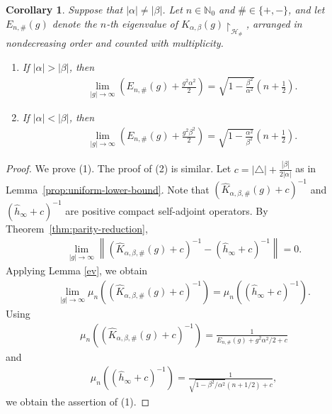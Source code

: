 \documentclass[12pt,dvipdfmx]{article}
\newtheorem{corollary}[theorem]{Corollary}
\newcommand{\NN}{\mathbb{N}}
\newcommand{\cH}{\mathcal{H}}
\begin{document}
\begin{corollary}\label{col:eigenvalues_conv}
Suppose that $|\alpha|\ne|\beta|$. 
Let $n\in\NN_0$ and $\#\in\{+,-\}$, and let $E_{n,\#}(g)$ denote the $n$-th eigenvalue of 
$K_{\alpha,\beta}(g)\upharpoonright_{\cH _\#}$, 
arranged in nondecreasing order and counted with multiplicity.
\begin{enumerate}
\item[(1)] If $|\alpha|>|\beta|$, then
\begin{align*}
    \lim_{|g|\to\infty}
    \left(
        E_{n,\#}(g) + \frac{g^2\alpha^2}{2}
    \right)
    =
    \sqrt{1 - \frac{\beta^2}{\alpha^2}} 
    \left(n + \frac12\right).
\end{align*}
\item[(2)] If $|\alpha|<|\beta|$, then
\begin{align*}
    \lim_{|g|\to\infty}
    \left(
        E_{n,\#}(g) + \frac{g^2\beta^2}{2}
    \right)
    =
    \sqrt{1 - \frac{\alpha^2}{\beta^2}}
    \left(n + \frac12\right).
\end{align*}
\end{enumerate}
\end{corollary}
%
\begin{proof}
We prove (1). The proof of (2) is similar. 
Let
$
    c = |\triangle| + \frac{|\beta|}{2|\alpha|}
$
as in Lemma~\ref{prop:uniform-lower-bound}. Note that $(\hat{K}_{\alpha,\beta,\#}(g) + c)^{-1}$ and $(\hat{h}_\infty + c)^{-1}$ are positive compact self-adjoint operators. By Theorem~\ref{thm:parity-reduction},
\begin{align*}
    \lim_{|g|\to\infty}
    \left\|
        (\hat{K}_{\alpha,\beta,\#}(g) + c)^{-1} - (\hat{h}_\infty + c)^{-1}
    \right\|
    = 0.
\end{align*}
Applying Lemma \ref{ev}, we obtain
\begin{align*}
    \lim_{|g|\to\infty}
    \mu_n \left( (\hat{K}_{\alpha,\beta,\#}(g) + c)^{-1} \right)
    =
    \mu_n \left( (\hat{h}_\infty + c)^{-1} \right).
\end{align*}
Using
\begin{align*}
    \mu_n \left( (\hat{K}_{\alpha,\beta,\#}(g) + c)^{-1} \right)
    =
    \frac{1}{
        E_{n,\#}(g) + g^2\alpha^2 / 2 + c
    }
\end{align*}
and
\begin{align*}
    \mu_n \left( (\hat{h}_\infty + c)^{-1} \right)
    =
    \frac{1}{\sqrt{1 - \beta^2 / \alpha^2} (n + 1/2) + c},
\end{align*}
we obtain the assertion of (1).
\end{proof}
\end{document}
